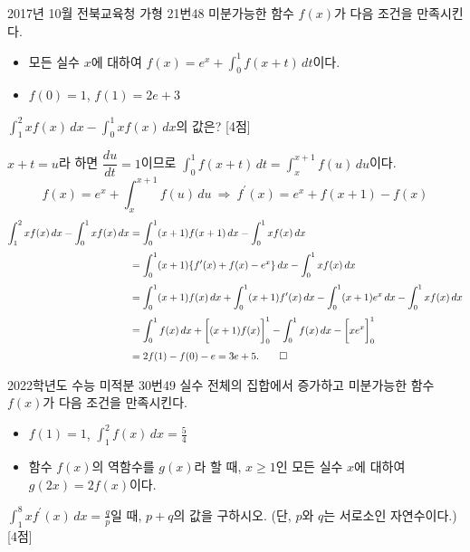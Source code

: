 \documentclass{article}
\begin{document}
\newpage
\begin{prob}{2017년 10월 전북교육청 가형 21번}{48}
	미분가능한 함수 $f(x)$가 다음 조건을 만족시킨다.
	\begin{hint}
		\begin{itemize}
			\item[(가)] 모든 실수 $x$에 대하여 $f(x)=e^x+\displaystyle\int_0^1f(x+t)\,dt$이다.
			\item[(나)] $f(0)=1$, $f(1)=2e+3$
		\end{itemize}
	\end{hint}
	$\displaystyle\int_1^2xf(x)\,dx-\int_0^1xf(x)\,dx$의 값은? [4점]
\end{prob}

\begin{sol}
	$x+t=u$라 하면 $\dfrac{du}{dt}=1$이므로 $\displaystyle\int_0^1f(x+t)\,dt=\int_{x}^{x+1}f(u)\,du$이다.
	\[
		f(x)=e^x+\int_x^{x+1}f(u)\,du~\Longrightarrow~f^{\prime}(x)=e^x+f(x+1)-f(x)
	\]
	\[
		\begin{aligned}
			\int_1^2xf(x)\,dx-\int_0^1xf(x)\,dx&=\int_0^1(x+1)f(x+1)\,dx-\int_0^1xf(x)\,dx\\[3pt]
			&=\int_0^1(x+1)\{f^{\prime}(x)+f(x)-e^x\}\,dx-\int_0^1xf(x)\,dx\\[3pt]
			&=\int_0^1(x+1)f(x)\,dx+\int_0^1(x+1)f^{\prime}(x)\,dx-\int_0^1(x+1)e^x\,dx-\int_0^1xf(x)\,dx\\[3pt]
			&=\int_0^1f(x)\,dx+\biggl[(x+1)f(x)\biggr]_0^1-\int_0^1f(x)\,dx-\biggl[xe^x\biggr]_0^1\\[3pt]
			&=2f(1)-f(0)-e=3e+5.\qed
		\end{aligned}
	\]
\end{sol}

\newpage
\begin{prob}{2022학년도 수능 미적분 30번}{49}
	실수 전체의 집합에서 증가하고 미분가능한 함수 $f(x)$가 다음 조건을 만족시킨다.
	\begin{hint}
		\begin{itemize}
			\item[(가)] $f(1)=1$, $\displaystyle\int_1^2f(x)\,dx=\frac{5}{4}$
			\item[(나)] 함수 $f(x)$의 역함수를 $g(x)$라 할 때, $x\geq1$인 모든 실수 $x$에 대하여 $g(2x)=2f(x)$이다.
		\end{itemize}
	\end{hint}
	$\displaystyle\int_1^8xf^{\prime}(x)\,dx=\frac{q}{p}$일 때, $p+q$의 값을 구하시오. (단, $p$와 $q$는 서로소인 자연수이다.) [4점]
\end{prob}
\end{document}
